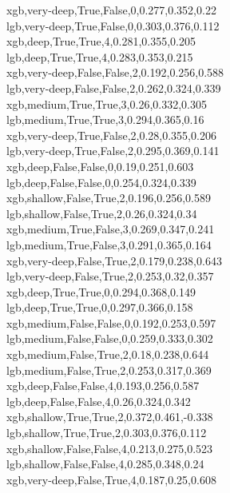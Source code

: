 xgb,very-deep,True,False,0,0.277,0.352,0.22 \\
lgb,very-deep,True,False,0,0.303,0.376,0.112 \\
xgb,deep,True,True,4,0.281,0.355,0.205 \\
lgb,deep,True,True,4,0.283,0.353,0.215 \\
xgb,very-deep,False,False,2,0.192,0.256,0.588 \\
lgb,very-deep,False,False,2,0.262,0.324,0.339 \\
xgb,medium,True,True,3,0.26,0.332,0.305 \\
lgb,medium,True,True,3,0.294,0.365,0.16 \\
xgb,very-deep,True,False,2,0.28,0.355,0.206 \\
lgb,very-deep,True,False,2,0.295,0.369,0.141 \\
xgb,deep,False,False,0,0.19,0.251,0.603 \\
lgb,deep,False,False,0,0.254,0.324,0.339 \\
xgb,shallow,False,True,2,0.196,0.256,0.589 \\
lgb,shallow,False,True,2,0.26,0.324,0.34 \\
xgb,medium,True,False,3,0.269,0.347,0.241 \\
lgb,medium,True,False,3,0.291,0.365,0.164 \\
xgb,very-deep,False,True,2,0.179,0.238,0.643 \\
lgb,very-deep,False,True,2,0.253,0.32,0.357 \\
xgb,deep,True,True,0,0.294,0.368,0.149 \\
lgb,deep,True,True,0,0.297,0.366,0.158 \\
xgb,medium,False,False,0,0.192,0.253,0.597 \\
lgb,medium,False,False,0,0.259,0.333,0.302 \\
xgb,medium,False,True,2,0.18,0.238,0.644 \\
lgb,medium,False,True,2,0.253,0.317,0.369 \\
xgb,deep,False,False,4,0.193,0.256,0.587 \\
lgb,deep,False,False,4,0.26,0.324,0.342 \\
xgb,shallow,True,True,2,0.372,0.461,-0.338 \\
lgb,shallow,True,True,2,0.303,0.376,0.112 \\
xgb,shallow,False,False,4,0.213,0.275,0.523 \\
lgb,shallow,False,False,4,0.285,0.348,0.24 \\
xgb,very-deep,False,True,4,0.187,0.25,0.608 \\
